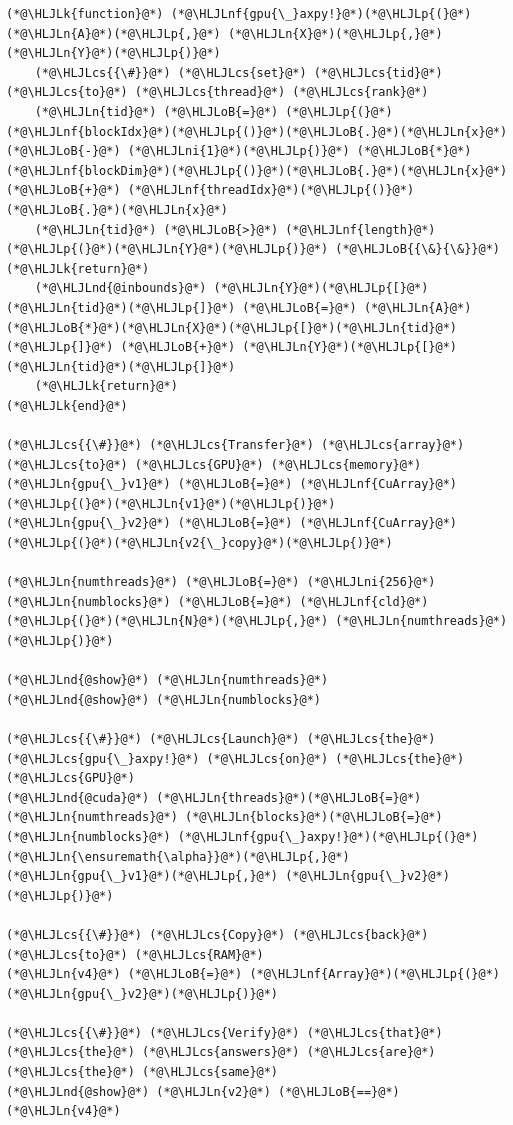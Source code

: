 \documentclass[12pt,a4paper]{article}
\newcommand{\HLJLk}[1]{\textcolor[RGB]{148,91,176}{\textbf{#1}}}
\newcommand{\HLJLn}[1]{#1}
\newcommand{\HLJLnd}[1]{\textcolor[RGB]{214,102,97}{#1}}
\newcommand{\HLJLnf}[1]{\textcolor[RGB]{66,102,213}{#1}}
\newcommand{\HLJLni}[1]{\textcolor[RGB]{59,151,46}{#1}}
\newcommand{\HLJLoB}[1]{\textcolor[RGB]{102,102,102}{\textbf{#1}}}
\newcommand{\HLJLp}[1]{#1}
\newcommand{\HLJLcs}[1]{\textcolor[RGB]{153,153,119}{\textit{#1}}}
\begin{document}
\begin{lstlisting}
(*@\HLJLk{function}@*) (*@\HLJLnf{gpu{\_}axpy!}@*)(*@\HLJLp{(}@*)(*@\HLJLn{A}@*)(*@\HLJLp{,}@*) (*@\HLJLn{X}@*)(*@\HLJLp{,}@*) (*@\HLJLn{Y}@*)(*@\HLJLp{)}@*) 
    (*@\HLJLcs{{\#}}@*) (*@\HLJLcs{set}@*) (*@\HLJLcs{tid}@*) (*@\HLJLcs{to}@*) (*@\HLJLcs{thread}@*) (*@\HLJLcs{rank}@*)
    (*@\HLJLn{tid}@*) (*@\HLJLoB{=}@*) (*@\HLJLp{(}@*)(*@\HLJLnf{blockIdx}@*)(*@\HLJLp{()}@*)(*@\HLJLoB{.}@*)(*@\HLJLn{x}@*) (*@\HLJLoB{-}@*) (*@\HLJLni{1}@*)(*@\HLJLp{)}@*) (*@\HLJLoB{*}@*) (*@\HLJLnf{blockDim}@*)(*@\HLJLp{()}@*)(*@\HLJLoB{.}@*)(*@\HLJLn{x}@*) (*@\HLJLoB{+}@*) (*@\HLJLnf{threadIdx}@*)(*@\HLJLp{()}@*)(*@\HLJLoB{.}@*)(*@\HLJLn{x}@*)
    (*@\HLJLn{tid}@*) (*@\HLJLoB{>}@*) (*@\HLJLnf{length}@*)(*@\HLJLp{(}@*)(*@\HLJLn{Y}@*)(*@\HLJLp{)}@*) (*@\HLJLoB{{\&}{\&}}@*) (*@\HLJLk{return}@*) 
    (*@\HLJLnd{@inbounds}@*) (*@\HLJLn{Y}@*)(*@\HLJLp{[}@*)(*@\HLJLn{tid}@*)(*@\HLJLp{]}@*) (*@\HLJLoB{=}@*) (*@\HLJLn{A}@*)(*@\HLJLoB{*}@*)(*@\HLJLn{X}@*)(*@\HLJLp{[}@*)(*@\HLJLn{tid}@*)(*@\HLJLp{]}@*) (*@\HLJLoB{+}@*) (*@\HLJLn{Y}@*)(*@\HLJLp{[}@*)(*@\HLJLn{tid}@*)(*@\HLJLp{]}@*)
    (*@\HLJLk{return}@*)
(*@\HLJLk{end}@*)

(*@\HLJLcs{{\#}}@*) (*@\HLJLcs{Transfer}@*) (*@\HLJLcs{array}@*) (*@\HLJLcs{to}@*) (*@\HLJLcs{GPU}@*) (*@\HLJLcs{memory}@*)
(*@\HLJLn{gpu{\_}v1}@*) (*@\HLJLoB{=}@*) (*@\HLJLnf{CuArray}@*)(*@\HLJLp{(}@*)(*@\HLJLn{v1}@*)(*@\HLJLp{)}@*)
(*@\HLJLn{gpu{\_}v2}@*) (*@\HLJLoB{=}@*) (*@\HLJLnf{CuArray}@*)(*@\HLJLp{(}@*)(*@\HLJLn{v2{\_}copy}@*)(*@\HLJLp{)}@*)

(*@\HLJLn{numthreads}@*) (*@\HLJLoB{=}@*) (*@\HLJLni{256}@*)
(*@\HLJLn{numblocks}@*) (*@\HLJLoB{=}@*) (*@\HLJLnf{cld}@*)(*@\HLJLp{(}@*)(*@\HLJLn{N}@*)(*@\HLJLp{,}@*) (*@\HLJLn{numthreads}@*)(*@\HLJLp{)}@*)

(*@\HLJLnd{@show}@*) (*@\HLJLn{numthreads}@*)
(*@\HLJLnd{@show}@*) (*@\HLJLn{numblocks}@*)

(*@\HLJLcs{{\#}}@*) (*@\HLJLcs{Launch}@*) (*@\HLJLcs{the}@*) (*@\HLJLcs{gpu{\_}axpy!}@*) (*@\HLJLcs{on}@*) (*@\HLJLcs{the}@*) (*@\HLJLcs{GPU}@*)
(*@\HLJLnd{@cuda}@*) (*@\HLJLn{threads}@*)(*@\HLJLoB{=}@*)(*@\HLJLn{numthreads}@*) (*@\HLJLn{blocks}@*)(*@\HLJLoB{=}@*)(*@\HLJLn{numblocks}@*) (*@\HLJLnf{gpu{\_}axpy!}@*)(*@\HLJLp{(}@*)(*@\HLJLn{\ensuremath{\alpha}}@*)(*@\HLJLp{,}@*) (*@\HLJLn{gpu{\_}v1}@*)(*@\HLJLp{,}@*) (*@\HLJLn{gpu{\_}v2}@*)(*@\HLJLp{)}@*)

(*@\HLJLcs{{\#}}@*) (*@\HLJLcs{Copy}@*) (*@\HLJLcs{back}@*) (*@\HLJLcs{to}@*) (*@\HLJLcs{RAM}@*)
(*@\HLJLn{v4}@*) (*@\HLJLoB{=}@*) (*@\HLJLnf{Array}@*)(*@\HLJLp{(}@*)(*@\HLJLn{gpu{\_}v2}@*)(*@\HLJLp{)}@*)

(*@\HLJLcs{{\#}}@*) (*@\HLJLcs{Verify}@*) (*@\HLJLcs{that}@*) (*@\HLJLcs{the}@*) (*@\HLJLcs{answers}@*) (*@\HLJLcs{are}@*) (*@\HLJLcs{the}@*) (*@\HLJLcs{same}@*)
(*@\HLJLnd{@show}@*) (*@\HLJLn{v2}@*) (*@\HLJLoB{==}@*) (*@\HLJLn{v4}@*)
\end{lstlisting}
\end{document}

